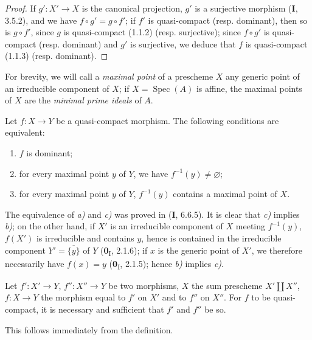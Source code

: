 \begin{proof}
If $g':X'\to X$ is the canonical projection, $g'$ is a surjective morphism
(\textbf{I}, 3.5.2), and we have $f\circ g'=g\circ f'$; if $f'$ is quasi-compact
(resp. dominant), then so is $g\circ f'$, since $g$ is
quasi-compact (1.1.2) (resp. surjective); since $f\circ g'$ is quasi-compact
(resp. dominant) and $g'$ is surjective, we deduce that $f$ is
quasi-compact (1.1.3) (resp. dominant).
\end{proof}


For brevity, we will call a \emph{maximal point} of a prescheme $X$ any
generic point of an irreducible component of $X$; if
$X=\operatorname{Spec}(A)$ is affine, the maximal points of $X$ are the
\emph{minimal prime ideals} of $A$.

\begin{proposition}[1.1.5]
\label{IV.1.1.5}
Let $f:X\to Y$ be a quasi-compact morphism. The following conditions are
equivalent:
\begin{enumerate}
  \item[\textup{a)}] $f$ is dominant;
  \item[\textup{b)}] for every maximal point $y$ of $Y$, we have
  $f^{-1}(y)\neq\varnothing$;
  \item[\textup{c)}] for every maximal point $y$ of $Y$, $f^{-1}(y)$ contains a
  maximal point of $X$.
\end{enumerate}
\end{proposition}

The equivalence of \emph{a)} and \emph{c)} was proved in (\textbf{I}, 6.6.5). It
is clear that \emph{c)} implies \emph{b)}; on the other hand, if $X'$ is an
irreducible component of $X$ meeting $f^{-1}(y)$, $f(X')$ is
irreducible and contains $y$, hence is contained in the irreducible component
$Y'=\overline{\{y\}}$ of $Y$ (\textbf{0}\textsubscript{I}, 2.1.6); if $x$ is the
generic point of $X'$, we therefore necessarily have $f(x)=y$
(\textbf{0}\textsubscript{I}, 2.1.5); hence \emph{b)} implies \emph{c)}.

\begin{proposition}[1.1.6]
\label{IV.1.1.6}
Let $f':X'\to Y$, $f'':X''\to Y$ be two morphisms, $X$ the sum prescheme
$X'\amalg X''$, $f:X\to Y$ the morphism equal to $f'$ on $X'$ and to $f''$
on $X''$. For $f$ to be quasi-compact, it is necessary and sufficient that
$f'$ and $f''$ be so.
\end{proposition}

This follows immediately from the definition.

